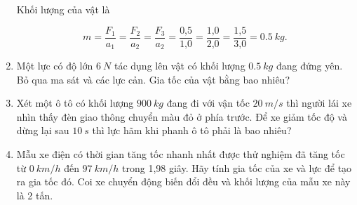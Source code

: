 \begin{enumerate}[label=\bfseries Bài \arabic*:]
	\hideall
	{	
		
		Khối lượng của vật là
		
		$$m = \dfrac{F_1}{a_1} = \dfrac{F_2}{a_2} = \dfrac{F_3}{a_2} = \dfrac{\text{0,5}}{\text{1,0}} = \dfrac{\text{1,0}}{\text{2,0}} =\dfrac{\text{1,5}}{\text{3,0}} = \SI{0,5}{kg}.$$
		
	}

	\item {}
	
	{
		
		Một lực có độ lớn $\SI{6}{N}$ tác dụng lên vật có khối lượng $\SI{0,5}{kg}$ đang đứng yên. Bỏ qua ma sát và các lực cản. Gia tốc của vật bằng bao nhiêu?
		
	}
	
	\item {}
	
	{
		Xét một ô tô có khối lượng $\SI{900}{kg}$ đang đi với vận tốc $\SI{20}{m/s}$ thì người lái xe nhìn thấy đèn giao thông chuyển màu đỏ ở phía trước. Để xe giảm tốc độ và dừng lại sau $\SI{10}{s}$ thì lực hãm khi phanh ô tô phải là bao nhiêu?
	}
	
	
	\item {}
	
	{
		
		Mẫu xe điện có thời gian tăng tốc nhanh nhất được thử nghiệm đã tăng tốc từ $\SI{0}{km/h}$ đến $\SI{97}{km/h}$ trong 1,98 giây. Hãy tính gia tốc của xe và lực để tạo ra gia tốc đó. Coi xe chuyển động biến đổi đều và khối lượng của mẫu xe này là 2 tấn.
	}
	
\end{enumerate}
